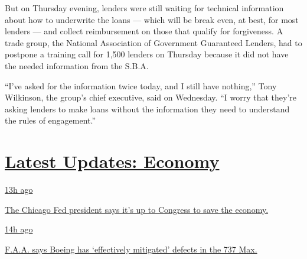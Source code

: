 But on Thursday evening, lenders were still waiting for technical
information about how to underwrite the loans --- which will be break
even, at best, for most lenders --- and collect reimbursement on those
that qualify for forgiveness. A trade group, the National Association of
Government Guaranteed Lenders, had to postpone a training call for 1,500
lenders on Thursday because it did not have the needed information from
the S.B.A.

``I've asked for the information twice today, and I still have
nothing,'' Tony Wilkinson, the group's chief executive, said on
Wednesday. ``I worry that they're asking lenders to make loans without
the information they need to understand the rules of engagement.''

\hypertarget{latest-updates-economy}{%
\section{\texorpdfstring{\href{https://www.nytimes3xbfgragh.onion/live/2020/08/03/business/stock-market-today-coronavirus?action=click\&pgtype=Article\&state=default\&region=MAIN_CONTENT_1\&context=storylines_live_updates}{Latest
Updates:
Economy}}{Latest Updates: Economy}}\label{latest-updates-economy}}

\href{https://www.nytimes3xbfgragh.onion/live/2020/08/03/business/stock-market-today-coronavirus?action=click\&pgtype=Article\&state=default\&region=MAIN_CONTENT_1\&context=storylines_live_updates\#the-chicago-fed-president-says-its-up-to-congress-to-save-the-economy}{13h
ago}

\href{https://www.nytimes3xbfgragh.onion/live/2020/08/03/business/stock-market-today-coronavirus?action=click\&pgtype=Article\&state=default\&region=MAIN_CONTENT_1\&context=storylines_live_updates\#the-chicago-fed-president-says-its-up-to-congress-to-save-the-economy}{The
Chicago Fed president says it's up to Congress to save the economy.}

\href{https://www.nytimes3xbfgragh.onion/live/2020/08/03/business/stock-market-today-coronavirus?action=click\&pgtype=Article\&state=default\&region=MAIN_CONTENT_1\&context=storylines_live_updates\#faa-says-boeing-has-effectively-mitigated-defects-in-the-737-max}{14h
ago}

\href{https://www.nytimes3xbfgragh.onion/live/2020/08/03/business/stock-market-today-coronavirus?action=click\&pgtype=Article\&state=default\&region=MAIN_CONTENT_1\&context=storylines_live_updates\#faa-says-boeing-has-effectively-mitigated-defects-in-the-737-max}{F.A.A.
says Boeing has `effectively mitigated' defects in the 737 Max.}

